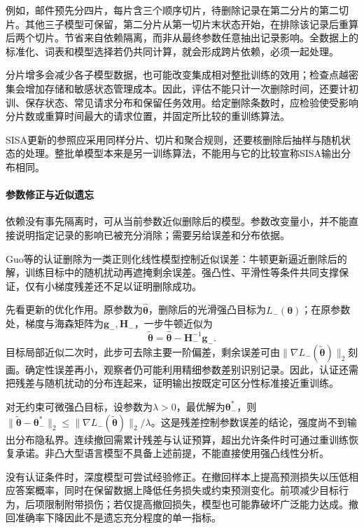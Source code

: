 例如，邮件预先分四片，每片含三个顺序切片，待删除记录在第二分片的第二切片。其他三子模型可保留，第二分片从第一切片末状态开始，在排除该记录后重算后两个切片。节省来自依赖隔离，而非从最终参数任意抽出记录影响。全数据上的标准化、词表和模型选择若仍共同计算，就会形成跨片依赖，必须一起处理。

分片增多会减少各子模型数据，也可能改变集成相对整批训练的效用；检查点越密集会增加存储和敏感状态管理成本。因此，评估不能只计一次删除时间，还要计初训、保存状态、常见请求分布和保留任务效用。给定删除条数时，应检验使受影响分片数或重算时间最大的请求位置，并固定所比较的重训练算法。

SISA更新的参照应采用同样分片、切片和聚合规则，还要核删除后抽样与随机状态的处理。整批单模型本来是另一训练算法，不能用与它的比较宣称SISA输出分布相同。

\paragraph{参数修正与近似遗忘}

依赖没有事先隔离时，可从当前参数近似删除后的模型。参数改变量小，并不能直接说明指定记录的影响已被充分消除；需要另给误差和分布依据。

Guo等的认证删除为一类正则化线性模型控制近似误差：牛顿更新逼近删除后的解，训练目标中的随机扰动再遮掩剩余误差。强凸性、平滑性等条件共同支撑保证，仅有小梯度残差还不足以证明删除成功。

先看更新的优化作用。原参数为$\hat{\bm\theta}$，删除后的光滑强凸目标为$L_-(\bm\theta)$；在原参数处，梯度与海森矩阵为$\bm g_-,\bm H_-$，一步牛顿近似为
\begin{equation}
 \tilde{\bm\theta}
 =\hat{\bm\theta}-\bm H_-^{-1}\bm g_-.
 \label{eq:privacy-newton-removal}
\end{equation}
目标局部近似二次时，此步可去除主要一阶偏差，剩余误差可由$\lVert\nabla L_-(\tilde{\bm\theta})\rVert_2$刻画。确定性误差再小，观察者仍可能利用精细参数差别识别记录。因此，认证还需把残差与随机扰动的分布连起来，证明输出按既定可区分性标准接近重训练。

对无约束可微强凸目标，设参数为$\lambda>0$，最优解为$\bm\theta_-^*$，则$\lVert\tilde{\bm\theta}-\bm\theta_-^*\rVert_2\leq\lVert\nabla L_-(\tilde{\bm\theta})\rVert_2/\lambda$。这是残差控制参数误差的结论，强度尚不到输出分布隐私界。连续撤回需累计残差与认证预算，超出允许条件时可通过重训练恢复承诺。非凸大型语言模型不具备上述前提，不能直接使用强凸线性分析。

没有认证条件时，深度模型可尝试经验修正。在撤回样本上提高预测损失以压低相应答案概率，同时在保留数据上降低任务损失或约束预测变化。前项减少目标行为，后项限制附带损伤；若仅提高撤回损失，模型也可能靠破坏广泛能力达成。撤回准确率下降因此不是遗忘充分程度的单一指标。

